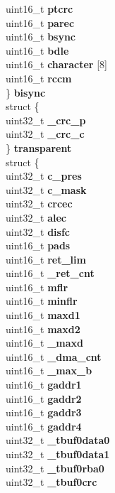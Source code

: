 \begin{DoxyCompactItemize}
\begin{tabbing}
\>\>uint16\_t {\bfseries ptcrc}\\
\>\>uint16\_t {\bfseries parec}\\
\>\>uint16\_t {\bfseries bsync}\\
\>\>uint16\_t {\bfseries bdle}\\
\>\>uint16\_t {\bfseries character} \mbox{[}8\mbox{]}\\
\>\>uint16\_t {\bfseries rccm}\\
\>\} {\bfseries bisync}\\
\>struct \{\\
\>\>uint32\_t {\bfseries \_crc\_p}\\
\>\>uint32\_t {\bfseries \_crc\_c}\\
\>\} {\bfseries transparent}\\
\>struct \{\\
\>\>uint32\_t {\bfseries c\_pres}\\
\>\>uint32\_t {\bfseries c\_mask}\\
\>\>uint32\_t {\bfseries crcec}\\
\>\>uint32\_t {\bfseries alec}\\
\>\>uint32\_t {\bfseries disfc}\\
\>\>uint16\_t {\bfseries pads}\\
\>\>uint16\_t {\bfseries ret\_lim}\\
\>\>uint16\_t {\bfseries \_ret\_cnt}\\
\>\>uint16\_t {\bfseries mflr}\\
\>\>uint16\_t {\bfseries minflr}\\
\>\>uint16\_t {\bfseries maxd1}\\
\>\>uint16\_t {\bfseries maxd2}\\
\>\>uint16\_t {\bfseries \_maxd}\\
\>\>uint16\_t {\bfseries \_dma\_cnt}\\
\>\>uint16\_t {\bfseries \_max\_b}\\
\>\>uint16\_t {\bfseries gaddr1}\\
\>\>uint16\_t {\bfseries gaddr2}\\
\>\>uint16\_t {\bfseries gaddr3}\\
\>\>uint16\_t {\bfseries gaddr4}\\
\>\>uint32\_t {\bfseries \_tbuf0data0}\\
\>\>uint32\_t {\bfseries \_tbuf0data1}\\
\>\>uint32\_t {\bfseries \_tbuf0rba0}\\
\>\>uint32\_t {\bfseries \_tbuf0crc}\\

\end{tabbing}
\end{DoxyCompactItemize}
